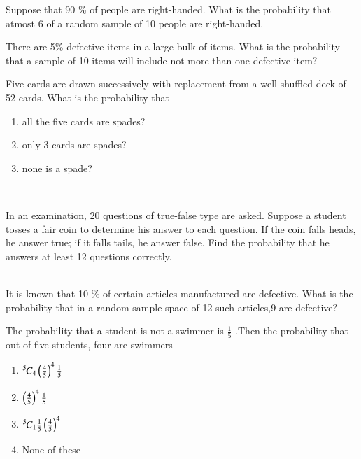 \item Suppose that 90 \% of people are right-handed. What is the probability that atmost 6 of a random sample of 10 people are right-handed. 
	\\
\solution

\item There are 5\% defective items in a large bulk of items. What is the probability that a sample of 10 items will include not more than one defective item?
	\\
\solution
\item Five cards are drawn successively with replacement from a well-shuffled deck
of 52 cards. What is the probability that
\begin{enumerate}
    \item all the five cards are spades?
    \item only 3 cards are spades?
    \item none is a spade?
\end{enumerate}
\solution
\\

\item In an examination, 20 questions of true-false type are asked. Suppose a student tosses a fair coin to determine his answer to each question. If the coin falls heads, he answer true; if it falls tails, he answer false. Find the probability that he answers at least 12 questions correctly.\\
\\
\solution

\item It is known that 10 $\%$ of certain articles manufactured are defective. What is the probability that in a random sample space of 12 such articles,9 are defective? \\
\solution

\item The probability that a student is not a swimmer is $\frac{1}{5}$ .Then the probability that out of five students, four are swimmers 
\begin{enumerate}
    \item ${{}^{5}\mkern-1muC_{4}}\left(\frac{4}{5}\right)^{4}\frac{1}{5}$ \label{item:9.3.6/1} \\
    \item $\left(\frac{4}{5}\right)^{4}\frac{1}{5}$ \label{item:9.3.6/2} \\
    \item \label{item:9.3.6/3}${{}^{5}\mkern-1muC_{1}}\frac{1}{5}\left(\frac{4}{5}\right)^{4}$\\
    \item \label{item:9.3.6/4}None of these
\end{enumerate}
